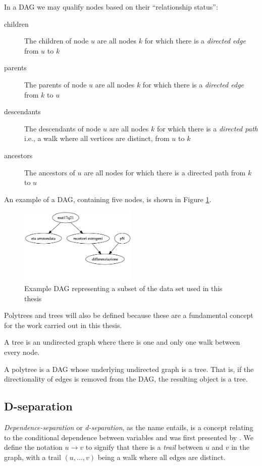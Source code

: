 In a DAG we may qualify nodes based on their \enquote{relationship status}:
\begin{description}
	\item[children] The children of node $u$ are all nodes $k$ for which there is a \textit{directed edge} from $u$ to $k$
	\item[parents] The parents of node $u$ are all nodes $k$ for which there is a \textit{directed edge} from $k$ to $u$
	\item[descendants] The descendants of node $u$ are all nodes $k$ for which there is a \textit{directed path} i.e., a walk where all vertices are distinct, from $u$ to $k$
	\item[ancestors] The ancestors of $u$ are all nodes for which there is a directed path from $k$ to $u$
\end{description}

An example of a DAG, containing five nodes, is shown in Figure \ref{fig:bn-example-dag}.

\begin{figure}[htbp]
\centerline{\includegraphics[width=0.5\textwidth]{mathematical-background/images/bn-example-structure}}
\caption{Example DAG representing a subset of the data set used in this thesis}
\label{fig:bn-example-dag}
\end{figure}

Polytrees and trees will also be defined because these are a fundamental concept for the work carried out in this thesis.
\begin{definition}[Tree] \label{def:tree}
	A tree is an undirected graph where there is one and only one walk between every node.	
\end{definition}
\begin{definition}[Polytree] \label{def:polytree}
	A polytree is a DAG whose underlying undirected graph is a tree.
	That is, if the directionality of edges is removed from the DAG, the resulting object is a tree. 
\end{definition}

\subsection{D-separation} \label{subsec:d-separation}
\textit{Dependence-separation} or \textit{d-separation}, as the name entails, is a concept relating to the conditional dependence between variables and was first presented by \citet{Pearl1988}.
We define the notation $u \rightarrow v$ to signify that there is a \textit{trail} between $u$ and $v$ in the graph, with a trail $(u, \ldots ,v)$ being a walk where all edges are distinct.

